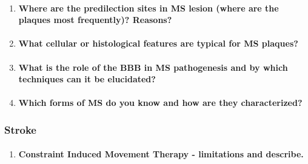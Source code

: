 \documentclass[12pt,article,oneside,a4paper]{memoir}
\begin{document}
\begin{enumerate}
\item \paragraph{Where are the predilection sites in MS lesion (where are the plaques most frequently)? Reasons?}

\item \paragraph{What cellular or histological features are typical for MS plaques?}

\item \paragraph{What is the role of the BBB in MS pathogenesis and by which techniques can it be elucidated?}

\item \paragraph{Which forms of MS do you know and how are they characterized?}
\end{enumerate}

\subsubsection{Stroke}
\begin{enumerate}
\item \paragraph{Constraint Induced Movement Therapy - limitations and describe.}
\end{enumerate}

\end{document}
